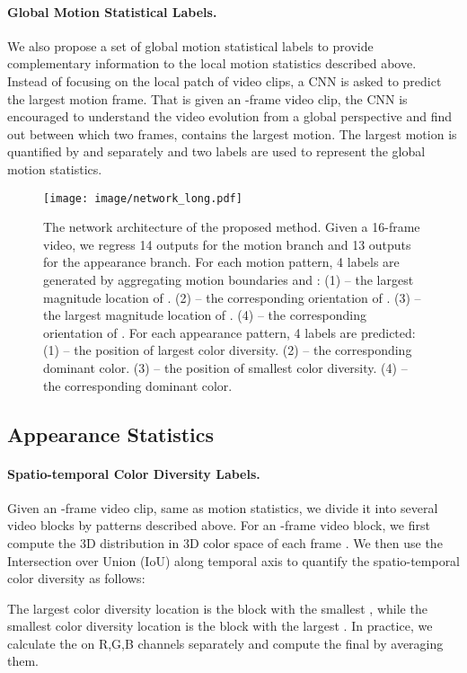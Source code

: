 \documentclass[10pt,twocolumn,letterpaper]{article}
\begin{document}
\paragraph{Global Motion Statistical Labels.} We also propose a set of global motion statistical labels to provide complementary information to the local motion statistics described above. 
Instead of focusing on the local patch of video clips, a CNN is asked to predict the largest motion frame. 
That is given an -frame video clip, the CNN is encouraged to understand the video evolution from a global perspective and find out between which two frames, contains the largest motion. 
The largest motion is quantified by  and  separately and two labels are used to represent the global motion statistics.

\begin{figure*}
    \centering
    \texttt{[image: image/network\_long.pdf]}\caption{The network architecture of the proposed method. Given a 16-frame video, we regress 14 outputs for the motion branch and 13 outputs for the appearance branch. For each motion pattern, 4 labels are generated by aggregating motion boundaries  and : (1)  -- the largest magnitude location of . (2)  -- the corresponding orientation of . (3)  -- the largest magnitude location of . (4)  -- the corresponding orientation of . For each appearance pattern, 4 labels are predicted: (1)  -- the position of largest color diversity. (2)  -- the corresponding dominant color. (3)  -- the position of smallest color diversity. (4)  -- the corresponding dominant color. }
    \label{fig:network}\end{figure*}

\subsection{Appearance Statistics}\label{sec.rgbstat}
\paragraph{Spatio-temporal Color Diversity Labels.} Given an  -frame video clip, same as motion statistics, we divide it into several video blocks by patterns described above.   
For an -frame video block, we first compute the 3D distribution  in 3D color space of each frame . 
We then use the Intersection over Union (IoU) along temporal axis to quantify the spatio-temporal color diversity as follows:


 
The largest color diversity location is the block with the smallest , while the smallest color diversity location is the block with the largest . In practice, we calculate the  on R,G,B channels separately and compute the final  by averaging them. 
 
\end{document}
